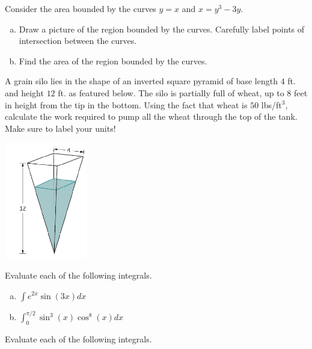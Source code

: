 \documentclass[11pt]{exam}
\theoremstyle{definition}
\begin{document}
\begin{questions}

\addpoints

\question[10]\mbox{}
Consider the area bounded by the curves $y=x$ and $x=y^3-3y$.

\begin{enumerate}[(a)]
\item  Draw a picture of the region bounded by the curves. Carefully label points of intersection between the curves.
\vspace{4in}
\item  Find the area of the region bounded by the curves.
\end{enumerate}



\newpage
\question[10]\mbox{} 

A grain silo lies in the shape of an inverted square pyramid of base length $4$ ft. and height $12$ ft. as featured below.
The silo is partially full of wheat, up to $8$ feet in height from the tip in the bottom.
Using the fact that wheat is $50$ lbs/ft$^3$, calculate the work required to pump all the wheat through the top of the tank.
Make sure to label your units!


\begin{center}
\includegraphics[height=2in]{grain.png}
\end{center}

\newpage
\question[10]\mbox{} 

Evaluate each of the following integrals.

\begin{enumerate}[(a)]
\item $\int e^{2x}\sin(3x)dx$
\vspace{4in}
\item $\int_0^{\pi/2} \sin^3(x)\cos^8(x)dx$
\end{enumerate}

\newpage
\question[10]\mbox{} 

Evaluate each of the following integrals.


\end{questions}
\end{document}
